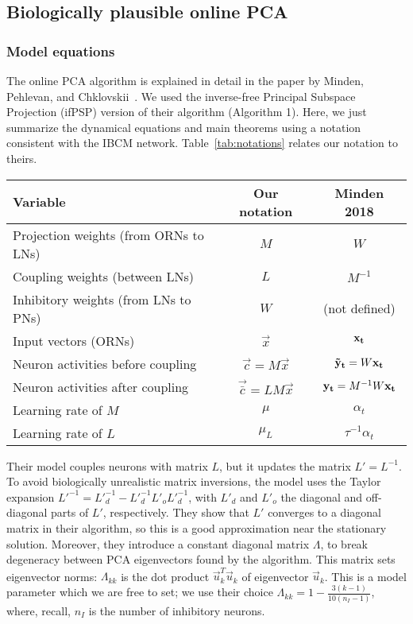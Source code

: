 \subsection{Biologically plausible online PCA}
\subsubsection{Model equations}
The online PCA algorithm is explained in detail in the paper by Minden, Pehlevan, and Chklovskii~\cite{minden_biologically_2018}. We used the inverse-free Principal Subspace Projection (ifPSP) version of their algorithm (Algorithm 1). Here, we just summarize the dynamical equations and main theorems using a notation consistent with the IBCM network. Table~\ref{tab:notations} relates our notation to theirs. 

\begin{table}[htb]
\centering
\begin{tabular}{lcc}
\toprule
Variable 	& Our notation	& Minden 2018 \\
\midrule
Projection weights (from ORNs to LNs)	& $M$	& $W$	\\
Coupling weights (between LNs)		& $L$		& $M^{-1}$	\\
Inhibitory weights (from LNs to PNs)	& $W$	& (not defined)	\\
Input vectors (ORNs)		& $\vec{x}$	& $\mathbf{x_t}$		\\
Neuron activities before coupling	& $\vec{c}=M\vec{x}$	& $\mathbf{\tilde{y}_t}= W \mathbf{x_t}$	\\
Neuron activities after coupling	& $\vec{\bar{c}}=LM\vec{x}$	& $\mathbf{y_t}=M^{-1} W \mathbf{x_t} $	\\
Learning rate of $M$			& $\mu$		& $\alpha_t$	\\
Learning rate of $L$			& $\mu_L$	& $\tau^{-1} \alpha_t$	\\
\bottomrule
\end{tabular}
\end{table}

Their model couples neurons with matrix $L$, but it updates the matrix $L' = L^{-1}$. To avoid biologically unrealistic matrix inversions, the model uses the Taylor expansion ${L'}^{-1} = {L'}_d^{-1} - {L'}_d^{-1} L'_o {L'}_d^{-1}$, with ${L'}_d$ and ${L'}_o$ the diagonal and off-diagonal parts of $L'$, respectively. They show that $L'$ converges to a diagonal matrix in their algorithm, so this is a good approximation near the stationary solution. Moreover, they introduce a constant diagonal matrix $\Lambda$, to break degeneracy between PCA eigenvectors found by the algorithm. This matrix sets eigenvector norms: $\Lambda_{kk}$ is the dot product $\vec{u}_k^T \vec{u}_k$ of eigenvector $\vec{u}_k$. This is a model parameter which we are free to set; we use their choice $\Lambda_{kk} = 1 - \frac{3(k-1)}{10(n_I - 1)}$, where, recall, $n_I$ is the number of inhibitory neurons. 


